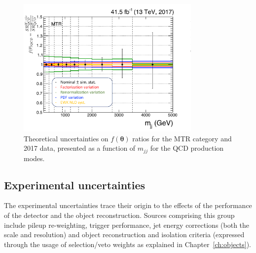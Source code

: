 \begin{figure}[htbp]
  \centering
    \includegraphics[width= 0.8\textwidth]{FIt_structure/theory_uncert_MTR_2017.pdf}
    
  \caption{Theoretical uncertainties on $f(\boldsymbol{\theta})$ ratios for the MTR category and 2017 data, presented as a function of $m_{jj}$ for the QCD production modes.}
  \label{fig:theory_MTR_2017}
\end{figure}




 
\subsection{Experimental uncertainties}
\hspace{10pt} The experimental uncertainties trace their origin to the effects of the performance of the detector and the object reconstruction. Sources comprising this group include pileup re-weighting, trigger performance, jet energy corrections (both the scale and resolution) and object reconstruction and isolation criteria (expressed through the usage of selection/veto weights as explained in Chapter~\ref{ch:objects}).


